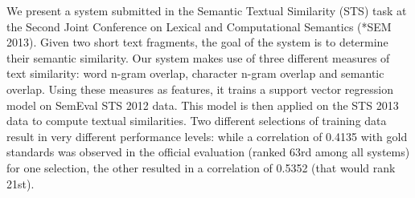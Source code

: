 We present a system submitted in the Semantic Textual Similarity (STS) task at the Second Joint Conference on Lexical and Computational Semantics (*SEM 2013).
 Given two short text fragments, the goal of the system is to determine
 their semantic similarity. Our system makes use of three different measures of
 text similarity: word n-gram overlap, character n-gram overlap and semantic
 overlap. Using these measures as features, it trains a support vector
 regression model on SemEval STS 2012 data. This model is then applied on the
 STS 2013 data to compute textual similarities. Two different selections of
 training data result in very different performance levels: while a correlation
 of 0.4135 with gold standards was observed in the official evaluation (ranked
 63rd among all systems) for one selection, the other resulted in a correlation
 of 0.5352 (that would rank 21st).

